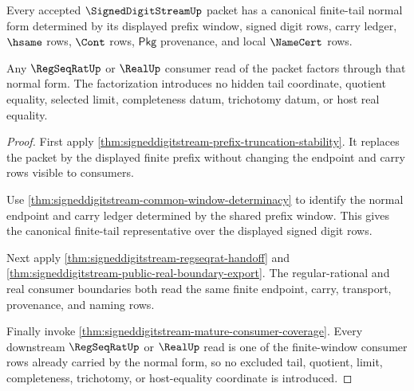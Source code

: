 \begin{theorem}
\label{thm:signeddigitstream-canonical-tail-normal-form}
Every accepted $\SignedDigitStreamUp$ packet has a canonical finite-tail normal
form determined by its displayed prefix window, signed digit rows, carry
ledger, $\hsame$ rows, $\Cont$ rows, $\mathsf{Pkg}$ provenance, and local
$\NameCert$ rows.

Any $\RegSeqRatUp$ or $\RealUp$ consumer read of the packet factors through
that normal form. The factorization introduces no hidden tail coordinate,
quotient equality, selected limit, completeness datum, trichotomy datum, or
host real equality.
\end{theorem}
\begin{proof}
First apply
\autoref{thm:signeddigitstream-prefix-truncation-stability}. It replaces the
packet by the displayed finite prefix without changing the endpoint and carry
rows visible to consumers.

Use \autoref{thm:signeddigitstream-common-window-determinacy} to identify the
normal endpoint and carry ledger determined by the shared prefix window. This
gives the canonical finite-tail representative over the displayed signed
digit rows.

Next apply \autoref{thm:signeddigitstream-regseqrat-handoff} and
\autoref{thm:signeddigitstream-public-real-boundary-export}. The
regular-rational and real consumer boundaries both read the same finite
endpoint, carry, transport, provenance, and naming rows.

Finally invoke
\autoref{thm:signeddigitstream-mature-consumer-coverage}. Every downstream
$\RegSeqRatUp$ or $\RealUp$ read is one of the finite-window consumer rows
already carried by the normal form, so no excluded tail, quotient, limit,
completeness, trichotomy, or host-equality coordinate is introduced.
\end{proof}

